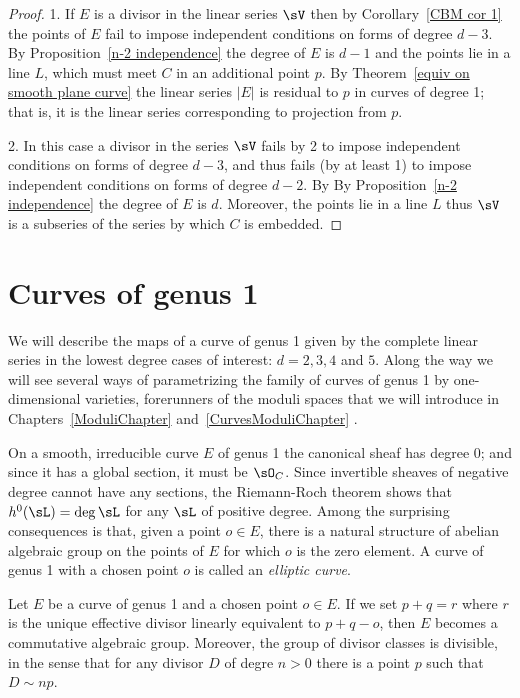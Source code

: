 \begin{proof}
 1. If $E$ is a divisor in the linear series $\sV$ then by Corollary~\ref{CBM cor 1} the points of $E$ fail to impose
 independent conditions on forms of degree $d-3$. By Proposition~\ref{n-2 independence} the degree of $E$ is $d-1$
 and the points lie in a line $L$, which must meet $C$ in an additional point $p$. By Theorem~\ref{equiv on smooth plane curve}
 the linear series $|E|$ is residual to $p$ in curves of degree 1; that is, it is the linear series corresponding to projection from $p$.
 
 2. In this case a divisor in the series $\sV$ fails by 2 to impose independent conditions on forms of degree $d-3$, and
 thus fails (by at least 1) to impose independent conditions on forms of degree $d-2$. By 
 By Proposition~\ref{n-2 independence} the degree of $E$ is $d$.
 Moreover, the points lie in a line $L$ thus $\sV$ is a subseries of the series by which $C$ is embedded.
 \end{proof}



\section{Curves of genus 1}

We will describe the maps of a curve of genus 1 given by
the complete linear series in the lowest degree cases of interest: $d =  2, 3, 4$ and $5$. Along the
way we will see several ways of parametrizing the family of curves of genus 1 by one-dimensional varieties,
forerunners of the moduli spaces that we will introduce in Chapters~\ref{ModuliChapter} and~\ref{CurvesModuliChapter} .


On a smooth, irreducible curve $E$ of genus 1 the canonical sheaf has degree 0; and since it has a global section, it must be $\sO_C$.
Since invertible sheaves of negative degree cannot have any sections, the Riemann-Roch theorem shows that
$h^0( \sL) = \deg \sL$ for any $\sL$ of positive degree. Among the surprising consequences is that, given
a point $o\in E$, there is a natural structure of abelian algebraic group on the points of $E$ for which $o$
is the zero element. A curve of genus 1 with a chosen point $o$ is called an \emph{elliptic curve}.

\begin{proposition}\label{group law} Let $E$ be a curve of genus 1 and a chosen point $o\in E$.
If we set $p+q = r$ where $r$ is the unique effective divisor linearly equivalent to $p+q-o$, then $E$ becomes a
commutative algebraic group.
Moreover, the group of divisor classes is divisible, in the sense that for any divisor $D$ of degre $n>0$
 there is a point $p$ such that $D\sim np$.
 \end{proposition}

